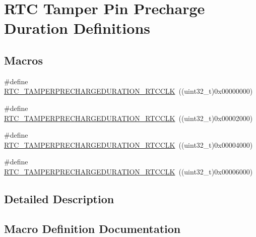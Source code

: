 \hypertarget{group___r_t_c_ex___tamper___pin___precharge___duration___definitions}{}\section{R\+TC Tamper Pin Precharge Duration Definitions}
\label{group___r_t_c_ex___tamper___pin___precharge___duration___definitions}
\subsection*{Macros}
\begin{DoxyCompactItemize}
\item 
\#define \hyperlink{group___r_t_c_ex___tamper___pin___precharge___duration___definitions_gac2a79623b1690b2e5893e6b53dad3480}{R\+T\+C\+\_\+\+T\+A\+M\+P\+E\+R\+P\+R\+E\+C\+H\+A\+R\+G\+E\+D\+U\+R\+A\+T\+I\+O\+N\+\_\+R\+T\+C\+C\+LK}~((uint32\+\_\+t)0x00000000)
\item 
\#define \hyperlink{group___r_t_c_ex___tamper___pin___precharge___duration___definitions_ga270be6ced6bafda4a94e5624a0bc3eab}{R\+T\+C\+\_\+\+T\+A\+M\+P\+E\+R\+P\+R\+E\+C\+H\+A\+R\+G\+E\+D\+U\+R\+A\+T\+I\+O\+N\+\_\+R\+T\+C\+C\+LK}~((uint32\+\_\+t)0x00002000)
\item 
\#define \hyperlink{group___r_t_c_ex___tamper___pin___precharge___duration___definitions_ga12497acabf044c2d1de7d735efdb2efc}{R\+T\+C\+\_\+\+T\+A\+M\+P\+E\+R\+P\+R\+E\+C\+H\+A\+R\+G\+E\+D\+U\+R\+A\+T\+I\+O\+N\+\_\+R\+T\+C\+C\+LK}~((uint32\+\_\+t)0x00004000)
\item 
\#define \hyperlink{group___r_t_c_ex___tamper___pin___precharge___duration___definitions_ga353fca64c5b0e927ab024ed13a526e09}{R\+T\+C\+\_\+\+T\+A\+M\+P\+E\+R\+P\+R\+E\+C\+H\+A\+R\+G\+E\+D\+U\+R\+A\+T\+I\+O\+N\+\_\+R\+T\+C\+C\+LK}~((uint32\+\_\+t)0x00006000)
\end{DoxyCompactItemize}


\subsection{Detailed Description}


\subsection{Macro Definition Documentation}

